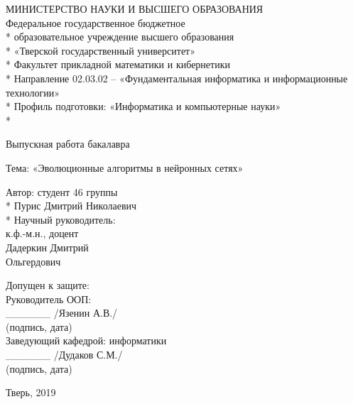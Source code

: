 \begin{titlepage} 
  \newpage 

  \begin{center} 
  МИНИСТЕРСТВО НАУКИ И ВЫСШЕГО ОБРАЗОВАНИЯ \\ 
  \vspace{1cm} 
  Федеральное государственное бюджетное \\* 
  образовательное учреждение высшего образования \\* 
  «Тверской государственный университет» \\* 
  Факультет прикладной математики и кибернетики \\* 
  Направление 02.03.02 – «Фундаментальная информатика и информационные технологии» \\* 
  Профиль подготовки: «Информатика и компьютерные науки» \\* 
  \hrulefill 
  \end{center} 
  
  
  \vspace{1em} 
  
  \begin{center} 
  \Large Выпускная работа бакалавра 
  \end{center} 
  
  \vspace{1.5em} 
  
  \begin{center} 
  Тема: «Эволюционные алгоритмы в нейронных сетях» 
  \end{center} 
  
  \vspace{6em} 
  
  \begin{flushright} 
  Автор: студент 46 группы \\* 
  Пурис Дмитрий Николаевич \\* 
  \vspace{1.5em} 
  Научный руководитель: \\ 
  к.ф.-м.н., доцент \\ 
  Дадеркин Дмитрий \\ 
  Ольгердович \\ 
  \end{flushright} 
  \begin{flushleft} 
  \vspace{1.5em} 
  Допущен к защите: \\ 
  Руководитель ООП: \\ 
  \_\_\_\_\_\_ /Язенин А.В./ \\ 
  (подпись, дата) \\ 
  Заведующий кафедрой: информатики \\ 
  \_\_\_\_\_\_ /Дудаков С.М./ \\ 
  (подпись, дата) 
  \end{flushleft} 
  
  \vspace{\fill} 
  
  \begin{center} 
  Тверь, 2019 
  \end{center} 
  
  \end{titlepage}